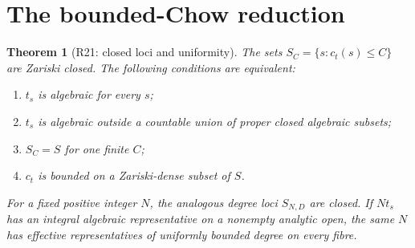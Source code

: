 \documentclass[11pt,a4paper]{article}
\newtheorem{theorem}{Theorem}[section]
\theoremstyle{definition}\newtheorem{definition}[theorem]{Definition}
\theoremstyle{remark}\newtheorem{remark}[theorem]{Remark}
\begin{document}
\section{The bounded-Chow reduction}
\begin{theorem}[R21: closed loci and uniformity]\label{R21}
The sets $S_C=\{s:c_t(s)\le C\}$ are Zariski closed. The following conditions are equivalent:
\begin{enumerate}[label=(\roman*)]
\item $t_s$ is algebraic for every $s$;
\item $t_s$ is algebraic outside a countable union of proper closed algebraic subsets;
\item $S_C=S$ for one finite $C$;
\item $c_t$ is bounded on a Zariski-dense subset of $S$.
\end{enumerate}
For a fixed positive integer $N$, the analogous degree loci $S_{N,D}$ are closed. If $Nt_s$ has an integral algebraic representative on a nonempty analytic open, the \emph{same} $N$ has effective representatives of uniformly bounded degree on every fibre.
\end{theorem}
\end{document}
